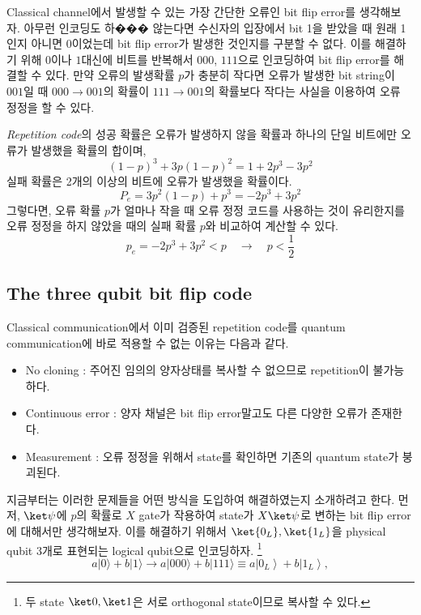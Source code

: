 Classical channel에서 발생할 수 있는 가장 간단한 오류인 bit flip error를 생각해보자. 아무런 인코딩도 하��� 않는다면 수신자의 입장에서 bit 1을 받았을 때 원래 1인지 아니면 0이었는데 bit flip error가 발생한 것인지를 구분할 수 없다.
이를 해결하기 위해 $0$이나 $1$대신에 비트를 반복해서 $000$, $111$으로 인코딩하여 bit flip error를 해결할 수 있다. 만약 오류의 발생확률 $p$가 충분히 작다면 오류가 발생한 bit string이 $001$일 때 $000 \rightarrow 001$의 확률이 $111 \rightarrow 001$의 확률보다 작다는 사실을 이용하여 오류 정정을 할 수 있다. 

\textit{Repetition code}의 성공 확률은 오류가 발생하지 않을 확률과 하나의 단일 비트에만 오류가 발생했을 확률의 합이며,
\begin{equation*}
    (1-p)^3+3p(1-p)^2 = 1 + 2p^3 - 3p^2
\end{equation*}
실패 확률은 2개의 이상의 비트에 오류가 발생했을 확률이다.
\begin{equation*}
    P_e  = 3p^2(1-p) + p^3 = - 2p^3 + 3p^2 
\end{equation*}
그렇다면, 오류 확률 $p$가 얼마나 작을 때 오류 정정 코드를 사용하는 것이 유리한지를 오류 정정을 하지 않았을 때의 실패 확률 $p$와 비교하여 계산할 수 있다.
\begin{equation*}
    p_e = -2p^3 + 3p^2 < p \quad \rightarrow \quad p < \frac{1}{2}
\end{equation*}

\subsection{The three qubit bit flip code}
Classical communication에서 이미 검증된 repetition code를 quantum communication에 바로 적용할 수 없는 이유는 다음과 같다.
\begin{itemize}
    \item No cloning : 주어진 임의의 양자상태를 복사할 수 없으므로 repetition이 불가능하다.
    \item Continuous error : 양자 채널은 bit flip error말고도 다른 다양한 오류가 존재한다.
    \item Measurement : 오류 정정을 위해서 state를 확인하면 기존의 quantum state가 붕괴된다.
\end{itemize} 
지금부터는 이러한 문제들을 어떤 방식을 도입하여 해결하였는지 소개하려고 한다. 먼저, $\ket \psi$에 $p$의 확률로 $X$ gate가 작용하여 state가 $X \ket \psi$로 변하는 bit flip error에 대해서만 생각해보자.
이를 해결하기 위해서 $\ket{0_L}, \ket{1_L}$을 physical qubit 3개로 표현되는 logical qubit으로 인코딩하자. \footnote{두 state $\ket 0, \ket 1$은 서로 orthogonal state이므로 복사할 수 있다.}
\begin{equation*}
    a|0\rangle+b|1\rangle \rightarrow a|000\rangle+b|111\rangle \equiv a\left|0_L\right\rangle+b\left|1_L\right\rangle,
\end{equation*}

